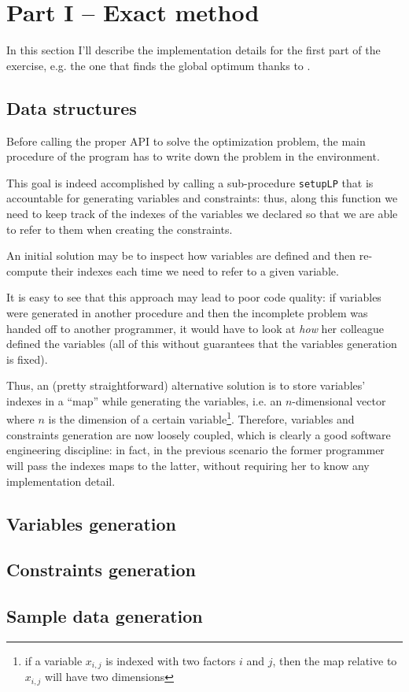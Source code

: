 \section{Part I -- Exact method}

In this section I'll describe the implementation details for the first part of
the exercise, e.g. the one that finds the global optimum thanks to \cplex.

\subsection{Data structures}
Before calling the proper API to solve the optimization problem, the main
procedure of the program has to write down the problem in the \cplex{}
environment.

This goal is indeed accomplished by calling a sub-procedure \texttt{setupLP}
that is accountable for generating variables and constraints: thus, along this
function we need to keep track of the indexes of the variables we declared so
that we are able to refer to them when creating the constraints.

An initial solution may be to inspect how variables are defined and then
re-compute their indexes each time we need to refer to a given variable.

It is easy to see that this approach may lead to poor code quality: if variables
were generated in another procedure and then the incomplete problem was handed
off to another programmer, it would have to look at \textit{how} her colleague
defined the variables (all of this without guarantees that the variables
generation is fixed).

Thus, an (pretty straightforward) alternative solution is to store variables'
indexes in a ``map'' while generating the variables, i.e. an $n$-dimensional
vector where $n$ is the dimension of a certain variable\footnote{if a variable
$x_{i,j}$ is indexed with two factors $i$ and $j$, then the map relative to
$x_{i,j}$ will have two dimensions}.
Therefore, variables and constraints generation are now loosely coupled, which
is clearly a good software engineering discipline: in fact, in the previous
scenario the former programmer will pass the indexes maps to the latter, without
requiring her to know any implementation detail.

\subsection{Variables generation}

\subsection{Constraints generation}

\subsection{Sample data generation}
